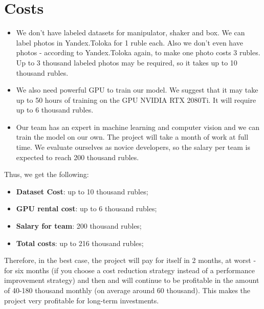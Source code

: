 \section{Costs}

\begin{itemize}

\item We don't have labeled datasets for manipulator, shaker and box. We can label photos in Yandex.Toloka for 1 ruble each. Also we don't even have photos - according to Yandex.Toloka again, to make one photo costs 3 rubles. Up to 3 thousand labeled photos may be required, so it takes up to 10 thousand rubles.

\item We also need powerful GPU to train our model. We suggest that it may take up to 50 hours of training on the GPU NVIDIA RTX 2080Ti. It will require up to 6 thousand rubles.

\item Our team has an expert in machine learning and computer vision and we can train the model on our own. The project will take a month of work at full time. We evaluate ourselves as novice developers, so the salary per team is expected to reach 200 thousand rubles.

\end{itemize}
Thus, we get the following:
\begin{itemize}
    \item \textbf{Dataset Cost}: up to 10 thousand rubles;
    \item \textbf{GPU rental cost}: up to 6 thousand rubles;
    \item \textbf{Salary for team}: 200 thousand rubles;
    \item \textbf{Total costs}: up to 216 thousand rubles;
\end{itemize}
Therefore, in the best case, the project will pay for itself in 2 months, at worst - for six months (if you choose a cost reduction strategy instead of a performance improvement strategy) and then and will continue to be profitable in the amount of 40-180 thousand monthly (on average around 60 thousand). This makes the project very profitable for long-term investments.
\newline